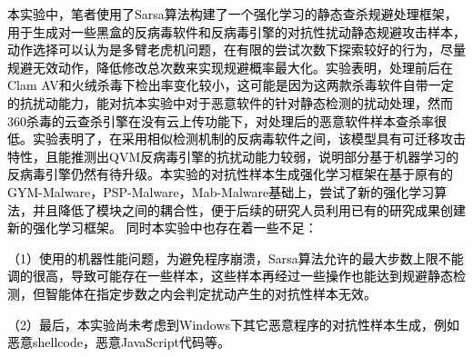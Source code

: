 
\begin{conclusion}

\textcolor{black}{本实验中，笔者使用了Sarsa算法构建了一个强化学习的静态查杀规避处理框架，用于生成对一些黑盒的反病毒软件和反病毒引擎的对抗性扰动静态规避攻击样本，动作选择可以认为是多臂老虎机问题，在有限的尝试次数下探索较好的行为，尽量规避无效动作，降低修改总次数来实现规避概率最大化。实验表明，处理前后在Clam AV和火绒杀毒下检出率变化较小，这可能是因为这两款杀毒软件自带一定的抗扰动能力，能对抗本实验中对于恶意软件的针对静态检测的扰动处理，然而360杀毒的云查杀引擎在没有云上传功能下，对处理后的恶意软件样本查杀率很低。实验表明了，在采用相似检测机制的反病毒软件之间，该模型具有可迁移攻击特性，且能推测出QVM反病毒引擎的抗扰动能力较弱，说明部分基于机器学习的反病毒引擎仍然有待升级。本实验的对抗性样本生成强化学习框架在基于原有的GYM-Malware，PSP-Malware，Mab-Malware基础上，尝试了新的强化学习算法，并且降低了模块之间的耦合性，便于后续的研究人员利用已有的研究成果创建新的强化学习框架。}
\textcolor{black}{同时本实验中也存在着一些不足：}

\textcolor{black}{（1）使用的机器性能问题，为避免程序崩溃，Sarsa算法允许的最大步数上限不能调的很高，导致可能存在一些样本，这些样本再经过一些操作也能达到规避静态检测，但智能体在指定步数之内会判定扰动产生的对抗性样本无效。}

\textcolor{black}{（2）最后，本实验尚未考虑到Windows下其它恶意程序的对抗性样本生成，例如恶意shellcode，恶意JavaScript代码等。}
\end{conclusion}
